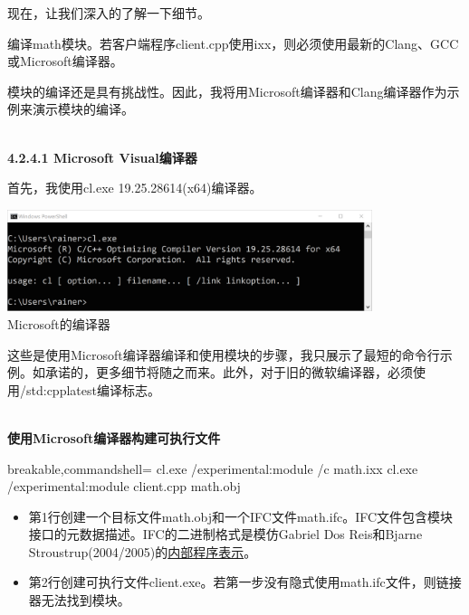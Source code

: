 现在，让我们深入的了解一下细节。


编译math模块。若客户端程序client.cpp使用ixx，则必须使用最新的Clang、GCC或Microsoft编译器。

模块的编译还是具有挑战性。因此，我将用Microsoft编译器和Clang编译器作为示例来演示模块的编译。

\hspace*{\fill} \\ %
\noindent
\textbf{4.2.4.1\hspace{0.2cm} Microsoft Visual编译器}

首先，我使用cl.exe 19.25.28614(x64)编译器。

\begin{center}
\includegraphics[width=0.8\textwidth]{content/3/chapter4/images/18.png}\\
Microsoft的编译器
\end{center}

这些是使用Microsoft编译器编译和使用模块的步骤，我只展示了最短的命令行示例。如承诺的，更多细节将随之而来。此外，对于旧的微软编译器，必须使用/std:cpplatest编译标志。

\hspace*{\fill} \\ %
\noindent
\textbf{使用Microsoft编译器构建可执行文件}
\begin{tcblisting}{breakable,commandshell={}}
cl.exe /experimental:module /c math.ixx
cl.exe /experimental:module client.cpp math.obj
\end{tcblisting}

\begin{itemize}
\item 
第1行创建一个目标文件math.obj和一个IFC文件math.ifc。IFC文件包含模块接口的元数据描述。IFC的二进制格式是模仿Gabriel Dos Reis和Bjarne Stroustrup(2004/2005)的\href{https://www.stroustrup.com/gdr-bs-macis09.pdf}{内部程序表示}。

\item 
第2行创建可执行文件client.exe。若第一步没有隐式使用math.ifc文件，则链接器无法找到模块。
\end{itemize}

